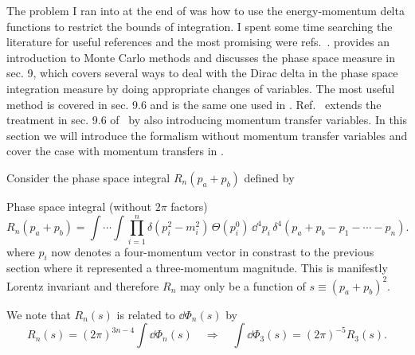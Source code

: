 \newcommand*{\sintheta}[2]{
    \sqrt{\frac{4 m_a^2 (-G_{#1})}{\lambda_{#1} \lambda_{#2}}}
}
\newcommand*{\costheta}[2]{
    \frac{\sqrt{\Lambda_{#1} \Lambda_{#2}} - 2 m_a^2 (t_{#1} + t_{#2} - m_{#2}^2)}{\sqrt{\lambda_{#1}\lambda_{#2}}}
}

\label{subsec:recursive-relation}
The problem I ran into at the end of  was how to use the energy-momentum delta functions to restrict the bounds of integration. 
I spent some time searching the literature for useful references and the most promising were refs.~\cite{James:1968gu,Byckling:1969sx,Isaacson:2021xty}.
\cite{James:1968gu} provides an introduction to Monte Carlo methods and discusses the phase space measure in sec. 9, which covers several ways to deal with the Dirac delta in the phase space integration measure by doing appropriate changes of variables.
The most useful method is covered in sec. 9.6 and is the same one used in \cite{Byckling:1969sx}. 
Ref.~\cite{Byckling:1969sx} extends the treatment in sec. 9.6 of~\cite{James:1968gu} by also introducing momentum transfer variables. 
In this section we will introduce the formalism without momentum transfer variables and cover the case with momentum transfers in .

Consider the phase space integral $R_n(p_a + p_b)$ defined by
\begin{bluenv}{Phase space integral (without $2 \pi$ factors)}
    \vspace{-3ex}
    \begin{equation}
        \label{eq:phase-space-integral-without-2pi}
        R_n(p_a + p_b) = 
        \int \cdots \int \prod_{i=1}^{n} \delta (p_i^2 - m_i^2) \, \Theta(p_i^0) \, 
        \dd^4 p_i \, \delta^4(p_a + p_b - p_1 - \cdots - p_n).
    \end{equation}
    where $p_i$ now denotes a four-momentum vector in constrast to the previous section where it represented a three-momentum magnitude.
    This is manifestly Lorentz invariant and therefore $R_n$ may only be a function of $s \equiv (p_a + p_b)^2$. 
\end{bluenv}


We note that $R_n(s)$ is related to $\dd \Phi_n(s)$ by
\begin{equation}
    R_n(s) = (2\pi)^{3n - 4} \int  \dd \Phi_n(s) 
    \quad \Rightarrow \quad 
    \int \dd \Phi_3(s) = (2\pi)^{-5} R_3(s).
\end{equation} 


